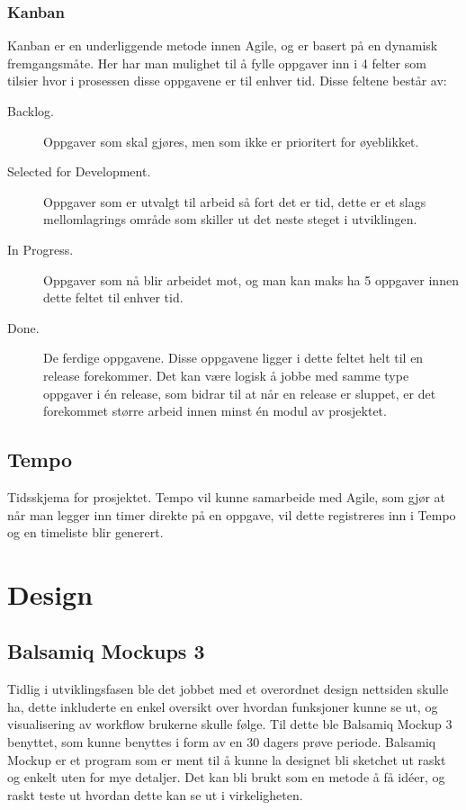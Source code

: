 \subsubsection*{Kanban}
Kanban er en underliggende metode innen Agile, og er basert på en dynamisk fremgangsmåte. Her har man mulighet til å fylle oppgaver inn i 4 felter som tilsier hvor i prosessen disse oppgavene er til enhver tid. Disse feltene består av: 

\begin{description}
\item[Backlog.]Oppgaver som skal  gjøres, men som ikke er prioritert for øyeblikket.

\item[Selected for Development.]Oppgaver som er utvalgt til arbeid så fort det er tid, dette er et slags mellomlagrings område som skiller ut det neste steget i utviklingen.

\item[In Progress.]Oppgaver som nå blir arbeidet mot, og man kan maks ha 5 oppgaver innen dette feltet til enhver tid.

\item[Done.] De ferdige oppgavene. Disse oppgavene ligger i dette feltet helt til en release forekommer. Det kan være logisk å jobbe med samme type oppgaver i én release, som bidrar til at når en release er sluppet, er det forekommet større arbeid innen minst én modul av prosjektet.
\end{description}


\subsection{Tempo}
Tidsskjema for prosjektet. Tempo vil kunne samarbeide med Agile, som gjør at når man legger inn timer direkte på en oppgave, vil dette registreres inn i Tempo og en timeliste blir generert.


\section{Design}
\subsection{Balsamiq Mockups 3}
Tidlig i utviklingsfasen ble det jobbet med et overordnet design nettsiden skulle ha, dette inkluderte en enkel oversikt over hvordan funksjoner kunne se ut, og visualisering av workflow brukerne skulle følge. Til dette ble Balsamiq Mockup 3 benyttet, som kunne benyttes i form av en 30 dagers prøve periode. Balsamiq Mockup er et program som er ment til å kunne la designet bli sketchet ut raskt og enkelt uten for mye detaljer. Det kan bli brukt som en metode å få idéer, og raskt teste ut hvordan dette kan se ut i virkeligheten.

